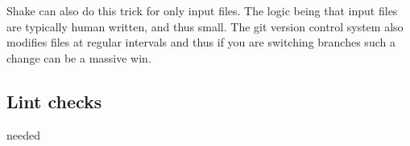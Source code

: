 Shake can also do this trick for only input files. The logic being that input files are typically human written, and thus small. The git version control system also modifies files at regular intervals and thus if you are switching branches such a change can be a massive win.

\subsection{Lint checks}

needed
